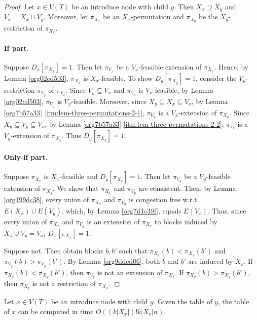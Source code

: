 \documentclass[fontsize=11pt,paper=a4]{book}
\begin{document}
\begin{proof}
Let \(x\in V(T)\) be an introduce node with child \(y\).
Then \(X_x\supseteq X_y\) and \(V_x=X_x\cup V_y\).
Moreover, let \(\pi_{X_x}\) be an \(X_x\)-permutation and \(\pi_{X_y}\) be the \(X_y\)-restriction of \(\pi_{X_x}\).

\paragraph{If part.}
Suppose \(D_x[\pi_{X_x}]=1\).
Then let \(\pi_{V_x}\) be a \(V_x\)-feasible extension of \(\pi_{X_x}\).
Hence, by Lemma \ref{org02cd503}, \(\pi_{X_x}\) is \(X_x\)-feasible.
To show \(D_y[\pi_{X_y}]=1\), consider the \(V_y\)-restriction \(\pi_{V_y}\) of \(\pi_{V_x}\).
Since \(V_y\subseteq V_x\) and \(\pi_{V_x}\) is \(V_x\)-feasible, by Lemma \ref{org02cd503}, \(\pi_{V_y}\) is \(V_y\)-feasible.
Moreover, since \(X_y\subseteq X_x\subseteq V_x\), by Lemma \ref{org7b57a33} \ref{itm:lem-three-permutations-2-1}, \(\pi_{V_x}\) is a \(V_x\)-extension of \(\pi_{X_y}\).
Since \(X_y\subseteq V_y\subseteq V_x\), by Lemma \ref{org7b57a33} \ref{itm:lem-three-permutations-2-2}, \(\pi_{V_y}\) is a \(V_y\)-extension of \(\pi_{X_y}\).
Thus \(D_y[\pi_{X_y}]=1\).

\paragraph{Only-if part.}
Suppose \(\pi_{X_x}\) is \(X_x\)-feasible and \(D_y[\pi_{X_y}]=1\).
Then let \(\pi_{V_y}\) be a \(V_y\)-feasible extension of \(\pi_{X_y}\).
We show that \(\pi_{X_x}\) and \(\pi_{V_y}\) are consistent.
Then, by Lemma \ref{org199dc38}, every union of \(\pi_{X_x}\) and \(\pi_{V_y}\) is congestion free w.r.t. \(E(X_x)\cup E(V_y)\), which, by Lemma \ref{org7d1c39f}, equals \(E(V_x)\).
Thus, since every union of \(\pi_{X_x}\) and \(\pi_{V_y}\) is an extension of \(\pi_{X_x}\) to blocks induced by \(X_x\cup V_y=V_x\), \(D_x[\pi_{X_x}]=1\).

Suppose not.
Then obtain blocks \(b,b'\) such that \(\pi_{X_x}(b)<\pi_{X_x}(b')\) and \(\pi_{V_y}(b)>\pi_{V_y}(b')\).
By Lemma \ref{org9dded06}, both \(b\) and \(b'\) are induced by \(X_y\).
If \(\pi_{X_y}(b)<\pi_{X_y}(b')\), then \(\pi_{V_y}\) is not an extension of \(\pi_{X_y}\).
If \(\pi_{X_y}(b)>\pi_{X_y}(b')\), then \(\pi_{X_y}\) is not a restriction of \(\pi_{X_x}\).
\end{proof}

\begin{lem}
Let \(x\in V(T)\) be an introduce node with child \(y\).
Given the table of \(y\), the table of \(x\) can be computed in time \(O((k\lvert X_x\rvert)!k\lvert X_x\rvert n)\).
\label{orgb3879bd}
\end{lem}
\end{document}
